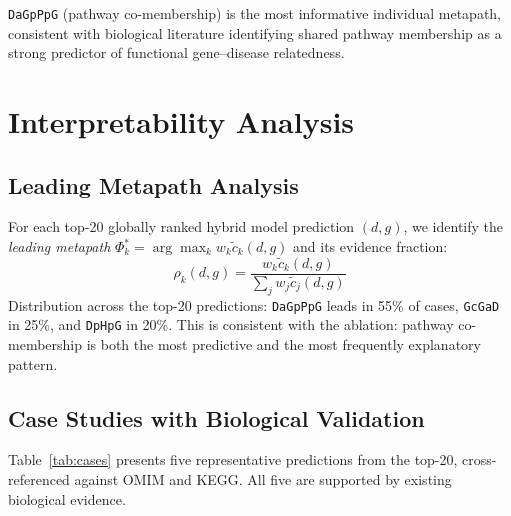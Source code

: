 \documentclass[10pt,a4paper,twocolumn]{article}
\begin{document}
\texttt{DaGpPpG} (pathway co-membership) is the most informative individual
metapath, consistent with biological literature identifying shared pathway
membership as a strong predictor of functional gene--disease relatedness.

\section{Interpretability Analysis}

\subsection{Leading Metapath Analysis}

For each top-20 globally ranked hybrid model prediction $(d,g)$, we identify the
\textit{leading metapath} $\Phi_k^* = \arg\max_k w_k\tilde{c}_k(d,g)$ and its
evidence fraction:
\begin{equation}
\rho_k(d,g) = \frac{w_k\tilde{c}_k(d,g)}{\sum_j w_j\tilde{c}_j(d,g)}
\end{equation}
Distribution across the top-20 predictions: \texttt{DaGpPpG} leads in 55\%
of cases, \texttt{GcGaD} in 25\%, and \texttt{DpHpG} in 20\%. This is
consistent with the ablation: pathway co-membership is both the most predictive
and the most frequently explanatory pattern.

\subsection{Case Studies with Biological Validation}

Table~\ref{tab:cases} presents five representative predictions from the top-20,
cross-referenced against OMIM and KEGG. All five are supported by existing
biological evidence.
\end{document}
